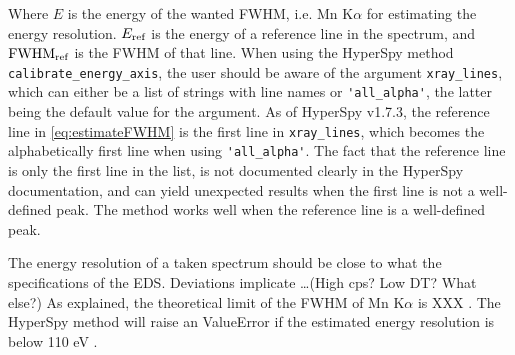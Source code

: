 Where $E$ is the energy of the wanted FWHM, i.e. Mn K$\alpha$ for estimating the energy resolution.
$E_\textnormal{ref}$ is the energy of a reference line in the spectrum, and $\textnormal{FWHM}_{\textnormal{ref}}$ is the FWHM of that line.
When using the HyperSpy method \verb|calibrate_energy_axis|, the user should be aware of the argument \verb|xray_lines|, which can either be a list of strings with line names or \verb|'all_alpha'|, the latter being the default value for the argument.
As of HyperSpy v1.7.3, the reference line in \cref{eq:estimateFWHM} is the first line in \verb|xray_lines|, which becomes the alphabetically first line when using \verb|'all_alpha'|.
The fact that the reference line is only the first line in the list, is not documented clearly in the HyperSpy documentation, and can yield unexpected results when the first line is not a well-defined peak.
The method works well when the reference line is a well-defined peak. 





The energy resolution of a taken spectrum should be close to what the specifications of the EDS.
Deviations implicate \dots (High cps? Low DT? What else?)
As explained, the theoretical limit of the FWHM of Mn K$\alpha$ is XXX .
The HyperSpy method will raise an ValueError if the estimated energy resolution is below 110 eV .




